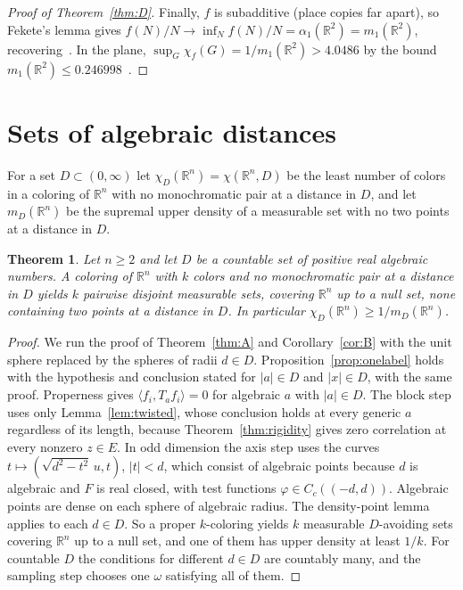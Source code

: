 \documentclass[11pt]{amsart}
\newtheorem{theorem}{Theorem}[section]
\theoremstyle{definition}
\newcommand{\R}{\mathbb{R}}
\begin{document}
\begin{proof}[Proof of Theorem~\ref{thm:D}]
Finally, $f$ is subadditive (place copies far apart), so Fekete's lemma gives $f(N)/N\to\inf_Nf(N)/N=\alpha_1(\R^2)=m_1(\R^2)$, recovering~\cite[Theorem 1.1]{LS}. In the plane, $\sup_G\chi_f(G)=1/m_1(\R^2)>4.0486$ by the bound $m_1(\R^2)\le0.246998$~\cite[Section 8]{ACMVZ}.
\end{proof}

\section{Sets of algebraic distances}\label{sec:multi}

For a set $D\subset(0,\infty)$ let $\chi_D(\R^n)=\chi(\R^n,D)$ be the least number of colors in a coloring of $\R^n$ with no monochromatic pair at a distance in $D$, and let $m_D(\R^n)$ be the supremal upper density of a measurable set with no two points at a distance in $D$.

\begin{theorem}\label{thm:E}
Let $n\ge2$ and let $D$ be a countable set of positive real algebraic numbers. A coloring of $\R^n$ with $k$ colors and no monochromatic pair at a distance in $D$ yields $k$ pairwise disjoint measurable sets, covering $\R^n$ up to a null set, none containing two points at a distance in $D$. In particular $\chi_D(\R^n)\ge1/m_D(\R^n)$.
\end{theorem}

\begin{proof}
We run the proof of Theorem~\ref{thm:A} and Corollary~\ref{cor:B} with the unit sphere replaced by the spheres of radii $d\in D$. Proposition~\ref{prop:onelabel} holds with the hypothesis and conclusion stated for $|a|\in D$ and $|x|\in D$, with the same proof. Properness gives $\langle f_i,T_af_i\rangle=0$ for algebraic $a$ with $|a|\in D$. The block step uses only Lemma~\ref{lem:twisted}, whose conclusion holds at every generic $a$ regardless of its length, because Theorem~\ref{thm:rigidity} gives zero correlation at every nonzero $z\in E$. In odd dimension the axis step uses the curves $t\mapsto(\sqrt{d^2-t^2}\,u,t)$, $|t|<d$, which consist of algebraic points because $d$ is algebraic and $F$ is real closed, with test functions $\varphi\in C_c((-d,d))$. Algebraic points are dense on each sphere of algebraic radius. The density-point lemma~\cite[Lemma 4.3]{OAI} applies to each $d\in D$. So a proper $k$-coloring yields $k$ measurable $D$-avoiding sets covering $\R^n$ up to a null set, and one of them has upper density at least $1/k$.
For countable $D$ the conditions for different $d\in D$ are countably many, and the sampling step chooses one $\omega$ satisfying all of them.
\end{proof}
\end{document}
